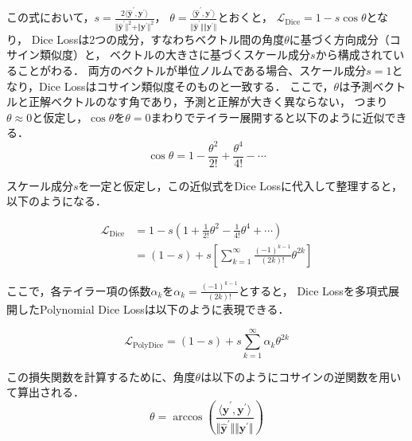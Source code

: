 \documentclass[10pt, a4paper, twocolumn]{jarticle}
\begin{document}
この式において，$s = \frac{2 \langle \hat{\mathbf{y}} ^ {\prime}, {\mathbf{y}} ^ {\prime} \rangle}{\Vert \hat{\mathbf{y}} ^ {\prime} \Vert ^ 2 + \Vert {\mathbf{y}} ^ {\prime} \Vert ^ 2}$，
$\theta = \frac{\langle \hat{\mathbf{y}} ^ {\prime}, {\mathbf{y}} ^ {\prime} \rangle}{\Vert \hat{\mathbf{y}} ^ {\prime} \Vert \Vert {\mathbf{y}} ^ {\prime} \Vert}$とおくと，
$\mathcal{L}_{\text{Dice}} = 1 - s \cos{\theta}$となり，
Dice Lossは2つの成分，すなわちベクトル間の角度$\theta$に基づく方向成分（コサイン類似度）と，
ベクトルの大きさに基づくスケール成分$s$から構成されていることがわる．
両方のベクトルが単位ノルムである場合、スケール成分$s=1$となり，Dice Lossはコサイン類似度そのものと一致する\cite{KATO2024107695}．
ここで，$\theta$は予測ベクトルと正解ベクトルのなす角であり，予測と正解が大きく異ならない，
つまり$\theta \approx 0$と仮定し，$\cos{\theta}$を$\theta = 0$まわりでテイラー展開すると以下のように近似できる．
\begin{equation}
  \cos{\theta} = 1 - \frac{\theta ^ 2}{2!} + \frac{\theta ^ 4}{4!} - \cdots
\end{equation}

スケール成分$s$を一定と仮定し，この近似式をDice Lossに代入して整理すると，以下のようになる．

\begin{equation}
  \begin{aligned}
  \mathcal{L}_{\text{Dice}} &= 1 - s \left(1 + \frac{1}{2!} \theta ^ 2 - \frac{1}{4!} \theta ^ 4 + \cdots\right) \\
  &= (1 - s) + s \left[\sum_{k = 1}^{\infty} \frac{(-1) ^ {k - 1}}{(2k)!} \theta ^ {2k}\right]
\end{aligned}
\end{equation}

ここで，各テイラー項の係数$\alpha_k$を$\alpha_k = \frac{(-1)^{k-1}}{(2k)!}$とすると，
Dice Lossを多項式展開したPolynomial Dice Lossは以下のように表現できる．

\begin{equation}
  \mathcal{L}_{\text{PolyDice}} = (1 - s) + s \sum_{k = 1}^{\infty} \alpha_k \theta ^ {2k}
\end{equation}

この損失関数を計算するために、角度$\theta$は以下のようにコサインの逆関数を用いて算出される．
\begin{equation}
  \theta = \arccos{\left(\frac{\langle \hat{\mathbf{y}} ^ {\prime}, {\mathbf{y}} ^ {\prime} \rangle}{\Vert \hat{\mathbf{y}} ^ {\prime} \Vert \Vert {\mathbf{y}} ^ {\prime} \Vert}\right)}
\end{equation}
\end{document}
